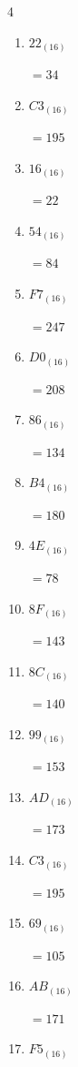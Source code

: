 \begin{multicols}{4}
\begin{enumerate}
  \item $22_{(16)}$

        $=34$

  \item $C3_{(16)}$

        $=195$

  \item $16_{(16)}$

        $=22$

  \item $54_{(16)}$

        $=84$

  \item $F7_{(16)}$

        $=247$

  \item $D0_{(16)}$

        $=208$

  \item $86_{(16)}$

        $=134$

  \item $B4_{(16)}$

        $=180$

  \item $4E_{(16)}$

        $=78$

  \item $8F_{(16)}$

        $=143$

  \item $8C_{(16)}$

        $=140$

  \item $99_{(16)}$

        $=153$

  \item $AD_{(16)}$

        $=173$

  \item $C3_{(16)}$

        $=195$

  \item $69_{(16)}$

        $=105$

\columnbreak %

  \item $AB_{(16)}$

        $=171$

  \item $F5_{(16)}$


\end{enumerate}
\end{multicols}
